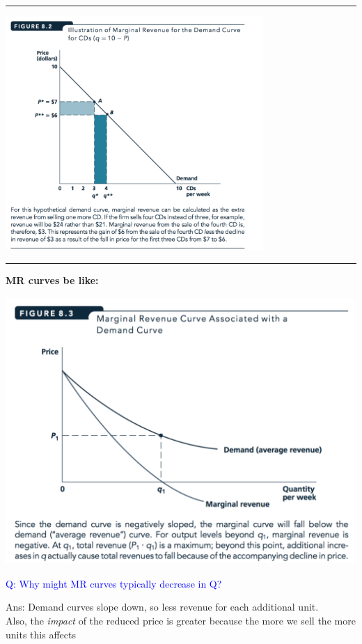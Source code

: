 \documentclass[]{article}
\begin{document}
\begin{center}\rule{0.5\linewidth}{\linethickness}\end{center}

\includegraphics[height=3.5in]{picsfigs/Mrillustrated.png}

\begin{center}\rule{0.5\linewidth}{\linethickness}\end{center}

\textbf{MR curves be like:}

\includegraphics[height=4in]{picsfigs/mrcurve.png}

\textcolor{blue}{Q: Why might MR curves typically decrease in Q?}

Ans: Demand curves slope down, so less revenue for each additional unit.\\
Also, the \emph{impact} of the reduced price is greater because the more we sell the more units this affects
\end{document}
